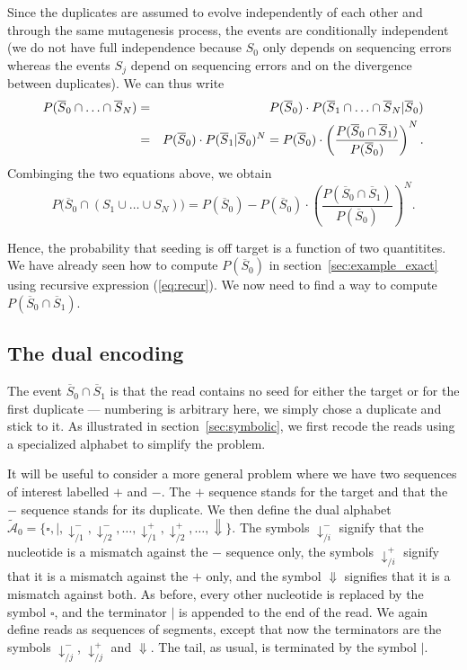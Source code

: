 \documentclass{article}
\begin{document}
Since the duplicates are assumed to evolve independently of each other and
through the same mutagenesis process, the events are conditionally
independent (we do not have full independence because $S_0$ only depends
on sequencing errors whereas the events $S_j$ depend on sequencing errors
and on the divergence between duplicates). We can thus write
\begin{eqnarray}
\notag
P(\overline{S}_0 \cap \ldots \cap \overline{S}_N) &=&
  P(\overline{S}_0) \cdot P(\overline{S}_1 \cap \ldots \cap
  \overline{S}_N | \overline{S}_0) \\
\label{eq:Pnull}
  &=& P(\overline{S}_0) \cdot P(\overline{S}_1 | \overline{S}_0)^N =
  P(\overline{S}_0) \cdot \left( \frac{P(\overline{S}_0 \cap
\overline{S}_1)}{P(\overline{S}_0)} \right)^N.
\end{eqnarray}
Combinging the two equations above, we obtain
\begin{equation}
\label{eq:Poff}
P\big(\overline{S}_0 \cap (S_1 \cup \ldots \cup S_N)\big) =
P(\overline{S}_0) - P(\overline{S}_0) \cdot \left( \frac{P(\overline{S}_0
\cap \overline{S}_1)}{P(\overline{S}_0)} \right)^N.
\end{equation}

Hence, the probability that seeding is off target is a function of two
quantitites. We have already seen how to compute $P(\overline{S}_0)$ in
section~\ref{sec:example_exact} using recursive expression
(\ref{eq:recur}). We now need to find a way to compute $P(\overline{S}_0
\cap \overline{S}_1)$.

\subsection{The dual encoding}
\label{sec:dual}

The event $\overline{S}_0 \cap \overline{S}_1$ is that the read contains
no seed for either the target or for the first duplicate --- numbering is
arbitrary here, we simply chose a duplicate and stick to it. As
illustrated in section~\ref{sec:symbolic}, we first recode the reads using
a specialized alphabet to simplify the problem.

It will be useful to consider a more general problem where we
have two sequences of interest labelled $+$ and $-$. The $+$ sequence
stands for the target and that the $-$ sequence stands for its duplicate.
We then define the dual alphabet $\tilde{\mathcal{A}}_0 = \{\square, |,
\downarrow_{/1}^-, \downarrow_{/2}^-, \ldots, \downarrow_{/1}^+,
\downarrow_{/2}^+, \ldots, \Downarrow\}$. The symbols $\downarrow_{/i}^-$
signify that the nucleotide is a mismatch against the $-$ sequence only,
the symbols $\downarrow_{/i}^+$ signify that it is a mismatch against the
$+$ only, and the symbol $\Downarrow$ signifies that it is a mismatch
against both. As before, every other nucleotide is replaced by the symbol
$\square$, and the terminator $|$ is appended to the end of the read. We
again define reads as sequences of segments, except that now the
terminators are the symbols $\downarrow_{/j}^-$, $\downarrow_{/j}^+$ and
$\Downarrow$. The tail, as usual, is terminated by the symbol $|$.
\end{document}
